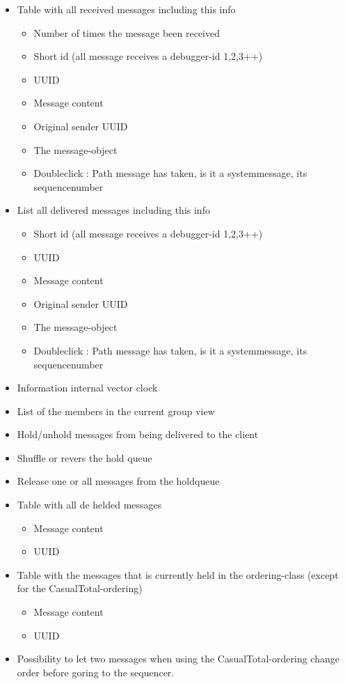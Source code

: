 \documentclass[titlepage, twocolumn, a4paper, 10pt]{article}
\begin{document}
\begin{itemize}
\item Table with all received messages including this info
  \begin{itemize}
  \item Number of times the message been received
  \item Short id (all message receives a debugger-id 1,2,3++)
  \item UUID
  \item Message content
  \item Original sender UUID
  \item The message-object
  \item Doubleclick : Path message has taken, is it a
    systemmessage, its sequencenumber
  \end{itemize}
\item List all delivered messages including this info
  \begin{itemize}
  \item Short id (all message receives a debugger-id 1,2,3++)
  \item UUID
  \item Message content
  \item Original sender UUID
  \item The message-object
  \item Doubleclick : Path message has taken, is it a
    systemmessage, its sequencenumber
  \end{itemize}
\item Information internal vector clock
\item List of the members in the current group view
\item Hold/unhold  messages from being delivered to the client
\item Shuffle or revers the hold queue
\item Release one or all messages from the holdqueue
\item Table with all de helded messages
  \begin{itemize}
  \item Message content
  \item UUID
  \end{itemize}
\item Table with the messages that is currently held in the
  ordering-class (except for the CasualTotal-ordering)
  \begin{itemize}
  \item Message content
  \item UUID
  \end{itemize}
\item Possibility to let two messages when using the
  CasualTotal-ordering change order before goring to the sequencer.
\end{itemize}
\end{document}
